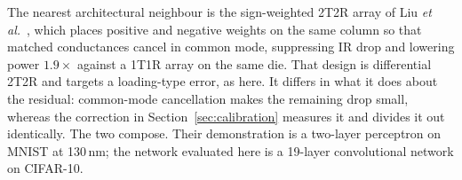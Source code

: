 \documentclass[conference]{IEEEtran}
\begin{document}
\begin{table}[H]
    \centering
    \caption{Measured compute-in-memory macros. ``Level'' distinguishes array-level from full-network efficiency; the two are not comparable.}
    \label{tab:sota}
\end{table}

The nearest architectural neighbour is the sign-weighted 2T2R array of Liu \emph{et al.}~\cite{swtt}, which places positive and negative weights on the same column so that matched conductances cancel in common mode, suppressing IR drop and lowering power $1.9\times$ against a 1T1R array on the same die. That design is differential 2T2R and targets a loading-type error, as here. It differs in what it does about the residual: common-mode cancellation makes the remaining drop small, whereas the correction in Section~\ref{sec:calibration} measures it and divides it out identically. The two compose. Their demonstration is a two-layer perceptron on MNIST at 130\,nm; the network evaluated here is a 19-layer convolutional network on CIFAR-10.
\end{document}
